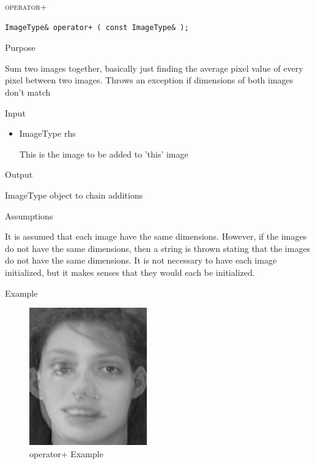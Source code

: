 \documentclass[pdftex, 11pt]{article}
\begin{document}
\begin{description}
\begin{description}
		\end{description}


	\item{\textsc{operator+}}
		\begin{description}

\begin{lstlisting}
ImageType& operator+ ( const ImageType& );
\end{lstlisting}

			\item{Purpose}

				
				Sum two images together, basically just finding
				the average pixel value of
				every pixel between two images.  Throws an
				exception if dimensions of both
				images don't match

			\item{Input}

				\begin{itemize}
						
					\item{ImageType rhs}

						This is the image to be added to
						'this' image

				\end{itemize}

			\item{Output}

				ImageType object to chain additions

			\item{Assumptions}

				It is assumed that each image have the same dimensions.
				However, if the images do not have the same dimensions,
				then a string is thrown stating that the images do
				not have the same dimensions. It is not necessary to have
				each image initialized, but it makes senses
				that they would each be initialized.

			\item{Example}

				\begin{figure}[p]
					\centering
					\caption{operator+ Example}
				\includegraphics{images/outasum.png}
			\end{figure}



\end{description}
\end{description}
\end{document}
